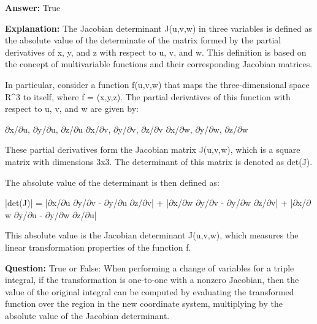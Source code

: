 \documentclass{article}
\begin{document}
                \textbf{Answer:} True

                \textbf{Explanation:} The Jacobian determinant J(u,v,w) in three variables is defined as the absolute value of the determinate of the matrix formed by the partial derivatives of x, y, and z with respect to u, v, and w. This definition is based on the concept of multivariable functions and their corresponding Jacobian matrices.

In particular, consider a function f(u,v,w) that maps the three-dimensional space R{\textasciicircum}3 to itself, where f = (x,y,z). The partial derivatives of this function with respect to u, v, and w are given by:

\ensuremath{\partial}x/\ensuremath{\partial}u, \ensuremath{\partial}y/\ensuremath{\partial}u, \ensuremath{\partial}z/\ensuremath{\partial}u
\ensuremath{\partial}x/\ensuremath{\partial}v, \ensuremath{\partial}y/\ensuremath{\partial}v, \ensuremath{\partial}z/\ensuremath{\partial}v
\ensuremath{\partial}x/\ensuremath{\partial}w, \ensuremath{\partial}y/\ensuremath{\partial}w, \ensuremath{\partial}z/\ensuremath{\partial}w

These partial derivatives form the Jacobian matrix J(u,v,w), which is a square matrix with dimensions 3x3. The determinant of this matrix is denoted as det(J).

The absolute value of the determinant is then defined as:

|det(J)| = |\ensuremath{\partial}x/\ensuremath{\partial}u \ensuremath{\partial}y/\ensuremath{\partial}v - \ensuremath{\partial}y/\ensuremath{\partial}u \ensuremath{\partial}z/\ensuremath{\partial}v| + |\ensuremath{\partial}x/\ensuremath{\partial}w \ensuremath{\partial}y/\ensuremath{\partial}v - \ensuremath{\partial}y/\ensuremath{\partial}w \ensuremath{\partial}z/\ensuremath{\partial}v| + |\ensuremath{\partial}x/\ensuremath{\partial}w \ensuremath{\partial}y/\ensuremath{\partial}u - \ensuremath{\partial}y/\ensuremath{\partial}w \ensuremath{\partial}z/\ensuremath{\partial}u|

This absolute value is the Jacobian determinant J(u,v,w), which measures the linear transformation properties of the function f.
                
                \vspace{0.5cm} 
        
            
                \textbf {Question:} True or False: When performing a change of variables for a triple integral, if the transformation is one-to-one with a nonzero Jacobian, then the value of the original integral can be computed by evaluating the transformed function over the region in the new coordinate system, multiplying by the absolute value of the Jacobian determinant.
                
\end{document}

